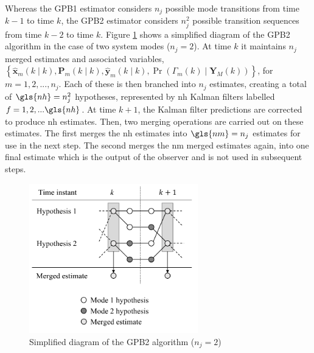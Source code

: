 Whereas the \gls{GPB1} estimator considers $n_j$ possible mode transitions from time $k-1$ to time $k$, the \gls{GPB2} estimator considers $n_j^2$ possible transition sequences from time $k-2$ to time $k$. Figure \ref{fig:mm-obs-gpb2} shows a simplified diagram of the \gls{GPB2} algorithm in the case of two system modes ($n_j=2$). At time $k$ it maintains $n_j$ merged estimates and associated variables, $\left\{ \hat{\mathbf{x}}_m(k \mid k), \mathbf{P}_m(k \mid k), \hat{\mathbf{y}}_m(k \mid k), \Pr(\Gamma_m(k) \mid \mathbf{Y}_M(k)) \right\}$, for $m=1,2,...,n_j$. Each of these is then branched into $n_j$ estimates, creating a total of $\gls{nh}=n_j^2$ hypotheses, represented by \gls{nh} Kalman filters labelled $f=1,2,...\gls{nh}$. At time $k+1$, the Kalman filter predictions are corrected to produce \gls{nh} estimates. Then, two merging operations are carried out on these estimates. The first merges the \gls{nh} estimates into $\gls{nm}=n_j$ estimates for use in the next step. The second merges the \gls{nm} merged estimates again, into one final estimate which is the output of the observer and is not used in subsequent steps.
\begin{figure}[ht]
	\centering
	\includegraphics[height=6.5cm]{images/gpb2_diagram.pdf}
	\caption{Simplified diagram of the \gls{GPB2} algorithm ($n_j=2$)}
	\label{fig:mm-obs-gpb2}
\end{figure}

